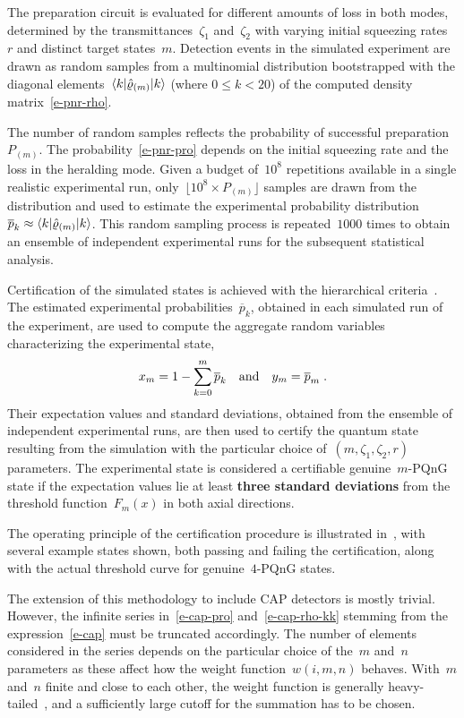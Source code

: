 \documentclass{article}
\begin{document}
The preparation circuit is evaluated for different amounts of loss in both modes, determined by the transmittances~$\zeta_{1}$ and~$\zeta_{2}$ with varying initial squeezing rates~$r$ and distinct target states~${m}$. Detection events in the simulated experiment are drawn as random samples from a multinomial distribution bootstrapped with the diagonal elements~$\braket{k|\hat{\varrho}_{(m)}|k}$ (where ${0 \leq k < 20}$) of the computed density matrix~\eqref{e-pnr-rho}. 

The number of random samples reflects the probability of successful preparation $P_{(m)}$. The probability~\eqref{e-pnr-pro} depends on the initial squeezing rate and the loss in the heralding mode. Given a budget of~$10^{8}$ repetitions available in a single realistic experimental run, only~${\lfloor 10^{8} \times P_{(m)} \rfloor}$ samples are drawn from the distribution and used to estimate the experimental probability distribution~${\overline{p}_{k} \approx \braket{k|\hat{\varrho}_{(m)}|k}}$. This random sampling process is repeated~$1000$ times to obtain an ensemble of independent experimental runs for the subsequent statistical analysis.

Certification of the simulated states is achieved with the hierarchical criteria~\cite{lachman2019}. The estimated experimental probabilities~$\overline{p}_{k}$, obtained in each simulated run of the experiment, are used to compute the aggregate random variables characterizing the experimental state,
%
\begin{equation}
  x_{m} = 1 - \sum_{k = 0}^{m} \overline{p}_{k} 
  \quad\text{and}\quad
  y_{m} = \overline{p}_{m} 
  \;\text{.}
\end{equation}
%
Their expectation values and standard deviations, obtained from the ensemble of independent experimental runs, are then used to certify the quantum state resulting from the simulation with the particular choice of~${(m, \zeta_{1}, \zeta_{2}, r)}$ parameters. The experimental state is considered a certifiable genuine~$m$-PQnG state if the expectation values lie at least \textbf{three standard deviations} from the threshold function~$F_{m} (x)$ in both axial directions.

The operating principle of the certification procedure is illustrated in~, with several example states shown, both passing and failing the certification, along with the actual threshold curve for genuine~$4$-PQnG states.

The extension of this methodology to include CAP detectors is mostly trivial. However, the infinite series in~\eqref{e-cap-pro} and~\eqref{e-cap-rho-kk} stemming from the expression~\eqref{e-cap} must be truncated accordingly. The number of elements considered in the series depends on the particular choice of the~$m$ and~$n$ parameters as these affect how the weight function~${w(i, m, n)}$ behaves. With~$m$ and~$n$ finite and close to each other, the weight function is generally heavy-tailed~\cite{provaznik2020}, and a sufficiently large cutoff for the summation has to be chosen.
\end{document}
